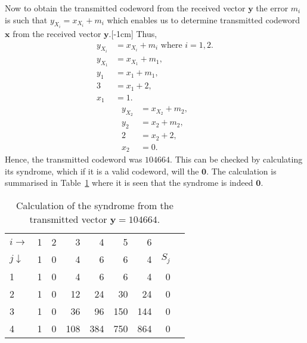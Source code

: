 Now to obtain the transmitted codeword from the received vector $\bm{y}$ the error $m_i$ is such that $y_{X_{i}}=x_{X_{i}} + m_i$ which enables us to determine transmitted codeword $\bm{x}$ from the received vector $\bm{y}$.[-1cm] Thus,
\begin{align*}
	y_{X_{i}}&=x_{X_{i}} + m_i \text{ where } i= 1,2.\\
	y_{X_{1}}&=x_{X_{1}} + m_1,\\
	y_1 &= x_1 + m_1,\\
	3 &= x_1 + 2,\\
	x_1 &= 1.
\end{align*}
\begin{align*}
	y_{X_{2}}&=x_{X_{2}} + m_2,\\
	y_2 &= x_2 + m_2,\\
	2 &= x_2 + 2,\\
	x_2 &= 0.
\end{align*}
Hence, the transmitted codeword was $104664$. This can be checked by calculating its syndrome, which if it is a valid codeword, will the $\bm{0}$. The calculation is summarised in Table~\ref{tab:3} where it is seen that the syndrome is indeed $\bm{0}$.
\begin{table}[!htp]\centering
\begin{tabular}{l|rrrrrr|rr}\toprule
$i\rightarrow$ &1 &2 &3 &4 &5 &6 & \\\cmidrule{1-7}
$j\downarrow$ &1 &0 &4 &6 &6 &4 &$S_j$ \\\midrule
1 &1 &0 &4 &6 &6 &4 &0 \\
2 &1 &0 &12 &24 &30 &24 &0 \\
3 &1 &0 &36 &96 &150 &144 &0 \\
4 &1 &0 &108 &384 &750 &864 &0 \\
\bottomrule
\end{tabular}
\caption{Calculation of the syndrome from the transmitted vector $\bm{y}=104664$.}\label{tab:3}
\end{table}


